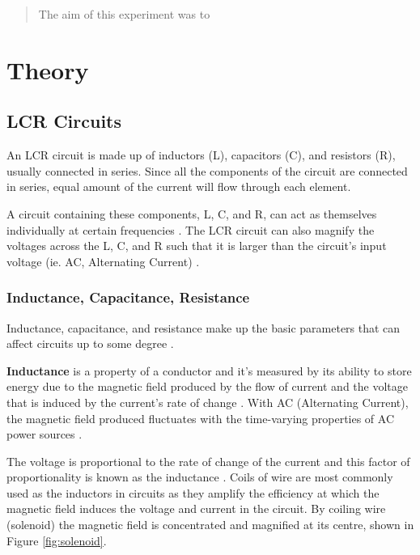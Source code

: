 \documentclass[12pt]{article}
\begin{document}
\begin{abstract}

The aim of this experiment was to



\end{abstract}




\section{Theory}

\subsection{LCR Circuits} \label{sec:1.1}
An LCR circuit is made up of inductors (L), capacitors (C), and resistors (R), usually connected in series.
Since all the components of the circuit are connected in series, equal amount of the current will flow through each element.
\cite{unacademy}

A circuit containing these components, L, C, and R, can act as themselves individually at certain frequencies
\cite{learnabout}.
The LCR circuit can also magnify the voltages across the L, C, and R such that it is larger than the  circuit's input voltage (ie. AC, Alternating Current)
\cite{learnabout}.

\subsubsection{Inductance, Capacitance, Resistance} \label{sec:1.1.1}

Inductance, capacitance, and resistance make up the basic parameters that can affect circuits up to some degree
\cite{elecnotes}.

\textbf{Inductance} is a property of a conductor
\cite{britinductance}
and it's measured by its ability to store energy due to the magnetic field produced by the flow of current
\cite{elecnotes}
and the voltage that is induced by the current's rate of change
\cite{britinductance}.
With AC (Alternating Current), the magnetic field produced fluctuates with the time-varying properties of AC power sources
\cite{elecnotes,britinductance}.

The voltage is proportional to the rate of change of the current and this factor of proportionality is known as the inductance
\cite{britinductance}.
Coils of wire are most commonly used as the inductors in circuits as they amplify \cite{elecnotes} the efficiency at which the magnetic field induces
the voltage and current in the circuit. By coiling wire (solenoid) the magnetic field is concentrated and magnified at its centre, shown in Figure \ref{fig:solenoid}.
\end{document}
